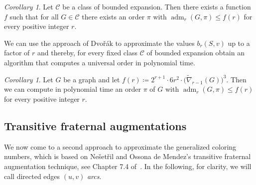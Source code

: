 \documentclass[1p,number,a4paper]{elsarticle}
\theoremstyle{remark}
\newcommand{\Cc}{\mathscr{C}}
\DeclareMathOperator{\adm}{adm}
\newtheorem{corollary}[theorem]{Corollary}
\begin{document}
\begin{corollary}
Let $\Cc$ be a class of bounded expansion. Then there exists
a function~$f$ such that for all $G\in\Cc$ there exists an 
order $\pi$ with $\adm_r(G,\pi)\leq f(r)$ for every positive
integer $r$. 
\end{corollary}

We can use the approach of Dvo\v{r}\'ak to approximate the 
values $b_r(S,v)$ up to a factor of $r$ and thereby, for every fixed class $\Cc$ of bounded
expansion obtain an algorithm that computes a universal order
in polynomial time.

\begin{corollary}
  Let $G$ be a graph and let 
 $f(r)\coloneqq 2^{r+1}\cdot 6r^2\cdot \bigr(\widetilde\nabla_{r-1}(G)\bigl)^3$.
 Then we can compute in polynomial time an order $\pi$ of $G$ with 
 $\adm_r(G,\pi)\leq f(r)$ for every positive integer $r$. 
\end{corollary}




\subsection{Transitive fraternal augmentations}

We now come to a second approach to approximate the generalized
coloring numbers, which is based on Ne{\v s}et{\v r}il and Ossona 
de Mendez's transitive fraternal augmentation technique, see
Chapter 7.4 of~\cite{nevsetril2012sparsity}. In the following, for clarity, we will call directed edges $(u,v)$ \emph{arcs}. 
\end{document}
